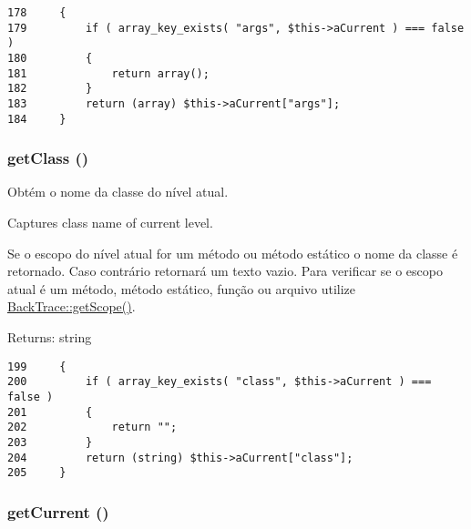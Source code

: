 \begin{Code}\begin{verbatim}178     {
179         if ( array_key_exists( "args", $this->aCurrent ) === false )
180         {
181             return array();
182         }
183         return (array) $this->aCurrent["args"];
184     }
\end{verbatim}
\end{Code}


\hypertarget{class_back_trace_23ecbde357f7f6bde5a50f876334a74d}{
\subsubsection[{getClass}]{\setlength{\rightskip}{0pt plus 5cm}getClass ()}}
\label{class_back_trace_23ecbde357f7f6bde5a50f876334a74d}


Obtém o nome da classe do nível atual.

Captures class name of current level.

Se o escopo do nível atual for um método ou método estático o nome da classe é retornado. Caso contrário retornará um texto vazio. Para verificar se o escopo atual é um método, método estático, função ou arquivo utilize \hyperlink{class_back_trace_0dce4e854dda57ffc316fd755df9b309}{BackTrace::getScope()}.

\begin{Desc}
\item[Returns:]string \end{Desc}


\begin{Code}\begin{verbatim}199     {
200         if ( array_key_exists( "class", $this->aCurrent ) === false )
201         {
202             return "";
203         }
204         return (string) $this->aCurrent["class"];
205     }
\end{verbatim}
\end{Code}


\hypertarget{class_back_trace_d926899d7cac34a3f1a90e552d8eb27d}{
\subsubsection[{getCurrent}]{\setlength{\rightskip}{0pt plus 5cm}getCurrent ()}}
\label{class_back_trace_d926899d7cac34a3f1a90e552d8eb27d}


